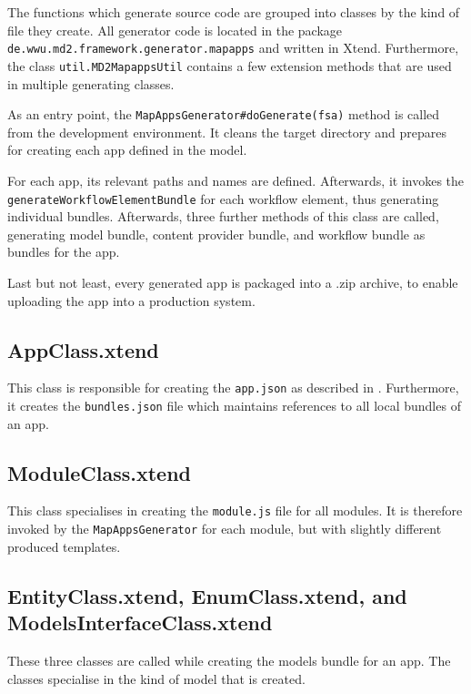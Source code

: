 
The functions which generate \mapapps source code are grouped into classes by the kind of file they create. All \mapapps generator code is located in the package \lstinline[language=Simple]|de.wwu.md2.framework.generator.mapapps| and written in Xtend. Furthermore, the class \lstinline|util.MD2MapappsUtil| contains a few extension methods that are used in multiple generating classes.

As an entry point, the \lstinline[language=Simple]|MapAppsGenerator#doGenerate(fsa)| method is called from the development environment. It cleans the target directory and prepares for creating  each app defined in the model.

For each app, its relevant paths and names are defined. Afterwards, it invokes the \lstinline|generateWorkflowElementBundle| for each workflow element, thus generating individual bundles. Afterwards, three further methods of this class are called, generating model bundle, content provider bundle, and workflow bundle as bundles for the app.


Last but not least, every generated app is packaged into a .zip archive, to enable uploading the app into a production \mapapps system.

\subsection{AppClass.xtend}

This class is responsible for creating the \lstinline[language=Simple]|app.json| as described in . Furthermore, it creates the \lstinline[language=Simple]|bundles.json| file which maintains references to all local bundles of an app.

\subsection{ModuleClass.xtend}

This class specialises in creating the \lstinline|module.js| file for all modules. It is therefore invoked by the \lstinline|MapAppsGenerator| for each module, but with slightly different produced templates.

\subsection{EntityClass.xtend, EnumClass.xtend, and ModelsInterfaceClass.xtend}
These three classes are called while creating the models bundle for an app. 
The classes specialise in the kind of model that is created.

